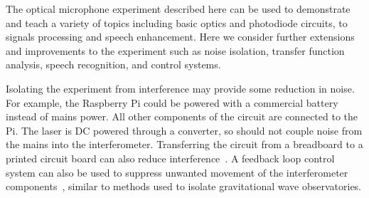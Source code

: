 \documentclass[paper-main.tex]{subfiles}
\begin{document}
The optical microphone experiment described here can be used to demonstrate and teach a variety of topics including basic optics and photodiode circuits, to signals processing and speech enhancement. Here we consider further extensions and improvements to the experiment such as noise isolation, transfer function analysis, speech recognition, and control systems.


Isolating the experiment from interference may provide some reduction in noise. 
For example, the Raspberry Pi could be powered with a commercial battery instead of mains power. 
All other components of the circuit are connected to the Pi. 
The laser is DC powered through a converter, so should not couple noise from the mains into the interferometer. 
Transferring the circuit from a breadboard to a printed circuit board can also reduce interference~\cite{elfekey2013design}.
A feedback loop control system can also be used to suppress unwanted movement of the interferometer components~\citep{abbott2017exploring, Sekiguchi:2016bmv, verhoeven2009robust}, similar to methods used to isolate gravitational wave observatories. 
\end{document}
